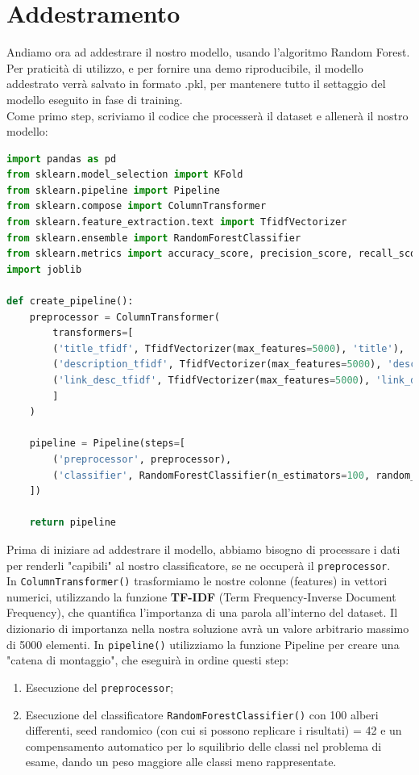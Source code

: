 \documentclass[a4paper,12pt]{report}
\begin{document}
\section{Addestramento}
Andiamo ora ad addestrare il nostro modello, usando l'algoritmo Random Forest.\\
Per praticità di utilizzo, e per fornire una demo riproducibile, il modello addestrato verrà salvato in formato .pkl, per mantenere tutto il settaggio del modello eseguito in fase di training.\\
Come primo step, scriviamo il codice che processerà il dataset e allenerà il nostro modello:
\begin{lstlisting}[language=Python]
import pandas as pd
from sklearn.model_selection import KFold
from sklearn.pipeline import Pipeline
from sklearn.compose import ColumnTransformer
from sklearn.feature_extraction.text import TfidfVectorizer
from sklearn.ensemble import RandomForestClassifier
from sklearn.metrics import accuracy_score, precision_score, recall_score
import joblib

def create_pipeline():
    preprocessor = ColumnTransformer(
        transformers=[
        ('title_tfidf', TfidfVectorizer(max_features=5000), 'title'),
        ('description_tfidf', TfidfVectorizer(max_features=5000), 'description'),
        ('link_desc_tfidf', TfidfVectorizer(max_features=5000), 'link_desc')
        ]
    )
    
    pipeline = Pipeline(steps=[
        ('preprocessor', preprocessor),
        ('classifier', RandomForestClassifier(n_estimators=100, random_state=42, class_weight="balanced"))
    ])
    
    return pipeline
\end{lstlisting}
Prima di iniziare ad addestrare il modello, abbiamo bisogno di processare i dati per renderli "capibili" al nostro classificatore, se ne occuperà il \texttt{preprocessor}.\\
In \texttt{ColumnTransformer()} trasformiamo le nostre colonne (features) in vettori numerici, utilizzando la funzione \textbf{TF-IDF} (Term Frequency-Inverse Document Frequency), che quantifica l'importanza di una parola all'interno del dataset. Il dizionario di importanza nella nostra soluzione avrà un valore arbitrario massimo di 5000 elementi.
\newpage
In \texttt{pipeline()} utilizziamo la funzione Pipeline per creare una "catena di montaggio", che eseguirà in ordine questi step:
\begin{enumerate}
    \item Esecuzione del \texttt{preprocessor};
    \item Esecuzione del classificatore \texttt{RandomForestClassifier()} con 100 alberi differenti, seed randomico (con cui si possono replicare i risultati) = 42 e un compensamento automatico per lo squilibrio delle classi nel problema di esame, dando un peso maggiore alle classi meno rappresentate.
\end{enumerate}
\end{document}
